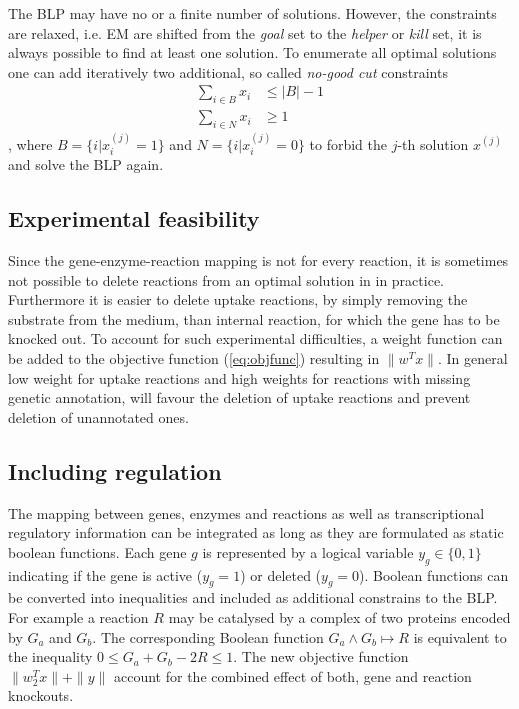 \documentclass{llncs}
\begin{document}
The BLP may have no or a finite number of solutions.
However, the constraints are relaxed, i.e. EM are shifted from the 
\emph{goal} set to the \emph{helper} or \emph{kill} set,
it is always possible to find at least one solution.
To enumerate all optimal solutions one can add iteratively 
two additional, so called \emph{no-good cut} constraints 
\begin{subequations}
    \begin{align}
        \sum_{i \in B} x_i & \leq |B| -1  \\
        \sum_{i \in N} x_i & \geq 1       
    \end{align}
\end{subequations}, 
where $B = \{i |x_{i}^{(j)} = 1\}$ and $N = \{i |x_{i}^{(j)} = 0\}$ to
forbid the $j$-th solution $x^{(j)}$ and solve the BLP again.

\subsection{Experimental feasibility}
Since the gene-enzyme-reaction mapping is not for every reaction, it is 
sometimes not possible to delete reactions from an optimal solution in
in practice. Furthermore it is easier to delete uptake reactions, by simply
removing the substrate from the medium, than internal reaction, for which the 
gene has to be knocked out.
To account for such experimental difficulties, a weight function can be
added to the objective function (\ref{eq:objfunc})
resulting in $\|w^{T}x\|$. 
In general low weight for uptake reactions and high weights for reactions
with missing genetic annotation, will favour the deletion of uptake reactions
and prevent deletion of unannotated ones.

\subsection{Including regulation}
The mapping between genes, enzymes and reactions as well as transcriptional 
regulatory information can be integrated as long as they are formulated 
as static boolean functions. Each gene $g$ is represented by a logical variable 
$y_{g} \in \{0,1\}$ indicating if the gene is active ($y_{g}=1$) or 
deleted ($y_{g}=0$).
Boolean functions can be converted into inequalities and included as 
additional constrains to the BLP.
For example a reaction $R$ may be catalysed by a complex of two proteins encoded
by $G_{a}$ and $G_{b}$. The corresponding Boolean function 
$G_{a} \land G_{b} \mapsto R$ is equivalent to the inequality 
$0 \leq G_{a} + G_{b} - 2R \leq 1$.
The new objective function $\|w_{2}^{T} x \| + \|y\|$ account for 
the combined effect of both, gene and reaction knockouts.
\end{document}
